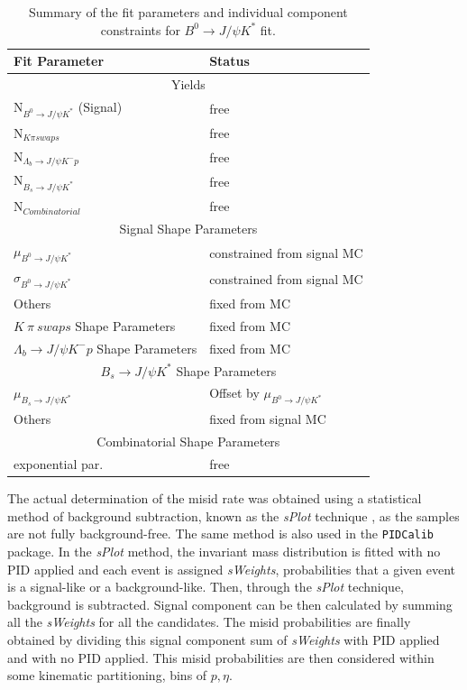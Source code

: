 \begin{table}[h]
\centering
\begin{tabular}{ l  l   }
Fit Parameter & Status  \\ \hline
	\multicolumn{2}{c}{Yields} \\ \hline
N$_{B^{0} \rightarrow J/\psi K^{*}}$ (Signal)  &  free \\
N$_{K \pi swaps}$ & free\\
N$_{\Lambda_{b} \rightarrow J/\psi K^{-} p}$ & free\\
N$_{B_{s} \rightarrow J/\psi K^{*}}$ & free \\
N$_{Combinatorial}$ & free\\
\hline
	\multicolumn{2}{c}{Signal Shape Parameters} \\
\hline
$\mu_{B^{0} \rightarrow J/\psi K^{*}}$ & constrained from signal MC\\
$\sigma_{B^{0} \rightarrow J/\psi K^{*}}$ & constrained from signal MC\\
Others & fixed from MC\\
\hline
$K\ \pi\ swaps$ Shape Parameters & fixed from MC \\
\hline
$\Lambda_{b} \rightarrow J/\psi K^{-} p$ Shape Parameters & fixed from MC \\
\hline
	\multicolumn{2}{c}{${B_{s} \rightarrow J/\psi K^{*}}$ Shape Parameters} \\
$\mu_{B_{s} \rightarrow J/\psi K^{*}}$ & Offset by $\mu_{B^{0} \rightarrow J/\psi K^{*}}$ \\
Others & fixed from signal MC \\
\hline
	\multicolumn{2}{c}{Combinatorial Shape Parameters}  \\
\hline
exponential par.  & free\\
\hline
\end{tabular}
\caption{Summary of the fit parameters and individual component constraints for $B^{0} \rightarrow J/\psi K^{*}$ fit.}
\label{tab:floatingparsummarylol}
\end{table}





\color{red}
The actual determination of the misid rate was obtained using a statistical method of background subtraction, known as the \textit{sPlot} technique \cite{sPlot}, as the samples are not fully background-free. The same method is also used in the \texttt{PIDCalib} package. In the \textit{sPlot} method, the invariant mass distribution is fitted with no \gls{PID} applied and each event is assigned \textit{sWeights}, probabilities that a given event is a signal-like or a background-like. Then, through the \textit{sPlot} technique, background is subtracted. Signal component can be then calculated by summing all the \textit{sWeights} for all the candidates. The misid probabilities are finally obtained by dividing this signal component sum of \textit{sWeights} with \gls{PID} applied and with no \gls{PID} applied. This misid probabilities are then considered within some kinematic partitioning, bins of $p,\eta$. 

